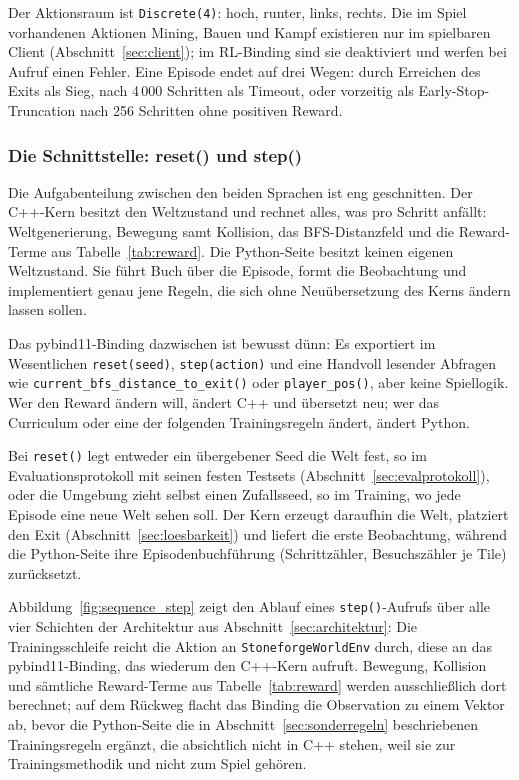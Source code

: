 \documentclass[11pt,a4paper]{article}
\begin{document}
Der Aktionsraum ist \texttt{Discrete(4)}: hoch, runter, links, rechts. Die im
Spiel vorhandenen Aktionen Mining, Bauen und Kampf existieren nur im
spielbaren Client (Abschnitt~\ref{sec:client}); im RL-Binding sind sie
deaktiviert und werfen bei Aufruf einen Fehler. Eine Episode endet auf drei
Wegen: durch Erreichen des Exits als Sieg, nach 4\,000 Schritten als
Timeout, oder vorzeitig als Early-Stop-Truncation nach 256 Schritten ohne
positiven Reward.

\subsubsection{Die Schnittstelle: reset() und step()}
\label{sec:schnittstelle}

Die Aufgabenteilung zwischen den beiden Sprachen ist eng geschnitten. Der
C++-Kern besitzt den Weltzustand und rechnet alles, was pro Schritt anfällt:
Weltgenerierung, Bewegung samt Kollision, das BFS-Distanzfeld und die
Reward-Terme aus Tabelle~\ref{tab:reward}. Die Python-Seite besitzt keinen
eigenen Weltzustand. Sie führt Buch über die Episode, formt die Beobachtung
und implementiert genau jene Regeln, die sich ohne Neuübersetzung des Kerns
ändern lassen sollen.

Das pybind11-Binding dazwischen ist bewusst dünn: Es exportiert im
Wesentlichen \texttt{reset(seed)}, \texttt{step(action)} und eine Handvoll
lesender Abfragen wie \texttt{current\_bfs\_distance\_to\_exit()} oder
\texttt{player\_pos()}, aber keine Spiellogik. Wer den Reward ändern will,
ändert C++ und übersetzt neu; wer das Curriculum oder eine der folgenden
Trainingsregeln ändert, ändert Python.

Bei \texttt{reset()} legt entweder ein übergebener Seed die Welt fest, so im
Evaluationsprotokoll mit seinen festen Testsets
(Abschnitt~\ref{sec:evalprotokoll}), oder die Umgebung zieht selbst einen
Zufallsseed, so im Training, wo jede Episode eine neue Welt sehen soll. Der
Kern erzeugt daraufhin die Welt, platziert den Exit
(Abschnitt~\ref{sec:loesbarkeit}) und liefert die erste Beobachtung, während
die Python-Seite ihre Episodenbuchführung (Schrittzähler, Besuchszähler je
Tile) zurücksetzt.

Abbildung~\ref{fig:sequence_step} zeigt den Ablauf eines \texttt{step()}-Aufrufs
über alle vier Schichten der Architektur aus Abschnitt~\ref{sec:architektur}:
Die Trainingsschleife reicht die Aktion an \texttt{StoneforgeWorldEnv} durch,
diese an das pybind11-Binding, das wiederum den C++-Kern aufruft. Bewegung,
Kollision und sämtliche Reward-Terme aus Tabelle~\ref{tab:reward} werden
ausschließlich dort berechnet; auf dem Rückweg flacht das Binding die
Observation zu einem Vektor ab, bevor die Python-Seite die in
Abschnitt~\ref{sec:sonderregeln} beschriebenen Trainingsregeln ergänzt, die
absichtlich nicht in C++ stehen, weil sie zur Trainingsmethodik und nicht zum
Spiel gehören.
\end{document}
